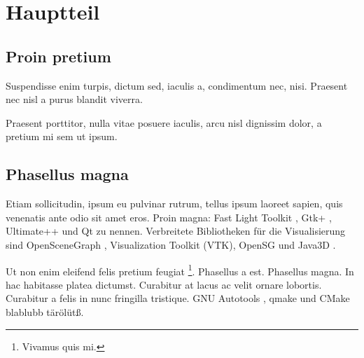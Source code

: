 \section{Hauptteil}

\subsection{Proin pretium}

Suspendisse enim turpis, dictum sed, iaculis a, condimentum nec, nisi. Praesent nec nisl a purus blandit viverra.

Praesent porttitor, nulla vitae posuere iaculis, arcu nisl dignissim dolor, a pretium mi sem ut ipsum.

\subsection{Phasellus magna}

Etiam sollicitudin, ipsum eu pulvinar rutrum, tellus ipsum laoreet sapien, quis venenatis ante odio sit amet eros. Proin magna:  
Fast Light Toolkit \cite{web:FLTK},
Gtk+ \cite{web:GTK+}, 
Ultimate++ \cite{web:U++} und 
Qt \cite{web:Qt}
zu nennen. Verbreitete Bibliotheken für die Visualisierung sind  
Open\-Scene\-Graph \cite{web:OSG}, 
Visualization Toolkit \cite{web:VTK} (VTK), 
OpenSG \cite{web:OpenSG} und 
Java3D \cite{web:Java3D}.

Ut non enim eleifend felis pretium feugiat \footnote{Vivamus quis mi.}. Phasellus a est. Phasellus magna. In hac habitasse platea dictumst. Curabitur at lacus ac velit ornare lobortis. Curabitur a felis in nunc fringilla tristique. GNU Autotools \cite{web:Automake,web:Autoconf},  
qmake \cite{web:qmake} und 
CMake \cite{web:CMake}
blablubb tärölütß.